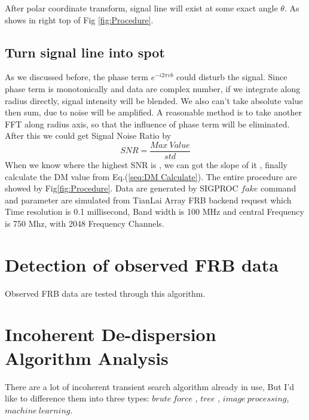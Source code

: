 \documentclass[iop]{emulateapj}
\begin{document}
 After polar coordinate transform, signal line will exist at some exact angle $\theta$. As shows in right top of Fig \ref{fig:Procedure}. 

\subsection{Turn signal line into spot}
As we discussed before, the phase term $e^{-i2\pi vb}$ could disturb the signal. Since phase term is monotonically and data are complex number, if we integrate along radius directly, signal intensity will be blended. We also can't take absolute value then sum,  due to noise will be amplified. A reasonable method is to take another FFT along radius axis, so that the influence of phase term will be eliminated.
After this we could get Signal Noise Ratio by 
\begin{equation*}
SNR = \frac{Max~Value }{std}
\end{equation*}
When we know where the highest SNR is , we can got the slope of it , finally calculate the DM value from Eq.(\ref{seq:DM Calculate}). 
The entire procedure are showed by Fig\ref{fig:Procedure}. Data are generated by SIGPROC $fake$ command and parameter are simulated from TianLai Array FRB backend request which Time resolution is 0.1 millisecond, Band width is 100 MHz and central Frequency is 750 Mhz,  with 2048 Frequency Channels.




\section{Detection of observed FRB data}
Observed FRB data are tested through this algorithm. 

\section{Incoherent De-dispersion Algorithm Analysis}
There are a lot of incoherent transient search algorithm already in use, But I'd like to difference them into three types: $brute~force$ , $tree$ ,  $image~processing$,$machine~learning$. \\

\end{document}
